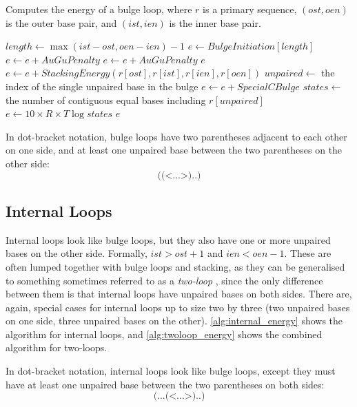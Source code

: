 \documentclass{cshonours}
\newcommand{\pushcode}[1]{\multido{\i=0+1}{#1}{\hskip\algorithmicindent}}
\begin{document}
\begin{algorithm}[H]
\caption{Computes the energy of a bulge loop, where $r$ is a primary sequence, $(ost, oen)$ is the outer base pair, and $(ist, ien)$ is the inner base pair.}
\label{alg:bulge_energy}
\begin{algorithmic}
\State $length \gets \max(ist - ost, oen - ien) - 1$
\State $e \gets BulgeInitiation[length]$ 
 
\State $e \gets e + AuGuPenalty$
\EndIf
{}
\State $e \gets e + AuGuPenalty$
\EndIf
\State \Return $e$
\EndIf
\State $e \gets e + StackingEnergy(r[ost], r[ist], r[ien], r[oen])$
\State $unpaired \gets$ the index of the single unpaired base in the bulge
\If{$r[unpaired] = C$ \textbf{and} \\
\pushcode{3} ($r[unpaired - 1] = C$ \textbf{or} $r[unpaired + 1] = C$)}
\State $e \gets e + SpecialCBulge$
\EndIf
\State $states \gets$ the number of contiguous equal bases including $r[unpaired]$
\State $e \gets 10 \times R \times T \log states$
\State \Return $e$
\EndFunction
\end{algorithmic}
\end{algorithm}

In dot-bracket notation, bulge loops have two parentheses adjacent to each other on one side, and at least one unpaired base between the two parentheses on the other side:
$$\texttt{((<...>)..)}$$

\subsection{Internal Loops}
Internal loops look like bulge loops, but they also have one or more unpaired bases on the other side. Formally, $ist > ost + 1$ and $ien < oen - 1$. These are often lumped together with bulge loops and stacking, as they can be generalised to something sometimes referred to as a \emph{two-loop} \cite{zukerSankoff}, since the only difference between them is that internal loops have unpaired bases on both sides. There are, again, special cases for internal loops up to size two by three (two unpaired bases on one side, three unpaired bases on the other). \autoref{alg:internal_energy} shows the algorithm for internal loops, and \autoref{alg:twoloop_energy} shows the combined algorithm for two-loops.

In dot-bracket notation, internal loops look like bulge loops, except they must have at least one unpaired base between the two parentheses on both sides:
$$\texttt{(...(<...>)..)}$$
\end{document}
